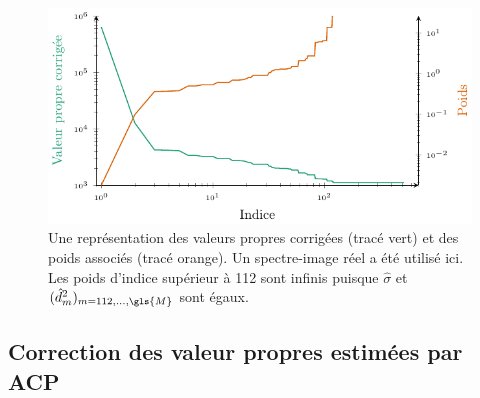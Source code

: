 \begin{figure}[ht]
    \centering
    \includegraphics[width=0.8\columnwidth]{img/chapitre3/figure2/weights_curve.pdf}
    \caption{Une représentation des valeurs propres corrigées (tracé vert) et des poids associés (tracé orange). Un spectre-image réel a été utilisé ici. Les poids d'indice supérieur à 112 sont infinis puisque $\hat{\sigma}$ et $(\hat{d}^2_{m})_{m=112,\dots,\gls{M}}$ sont égaux.
        \protect\label{fig-S_constraint}}
\end{figure}


\subsection{Correction des valeur propres estimées par ACP}\label{subsec-3s-acp}

